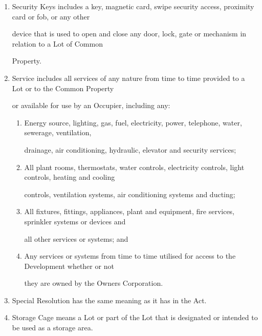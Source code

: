 \documentclass{article}
\begin{document}
\begin{enumerate}[label=\arabic*.]
\begin{enumerate}[label=\arabic{enumi}.\arabic*.]
\begin{enumerate}[label=(\arabic*)]
\item {\fontsize{9.962}{1} Security Keys includes a key, magnetic card, swipe security access, proximity card or fob, or any other }

{\fontsize{10.02}{1}device that is used to open and close any door, lock, gate or mechanism in relation to a Lot of Common }

{\fontsize{10.02}{1}Property. }

\item {\fontsize{9.962}{1} Service includes all services of any nature from time to time provided to a Lot or to the Common Property }

{\fontsize{10.02}{1}or available for use by an Occupier, including any: }

\begin{enumerate}[label=(\alph*)]
\item {\fontsize{9.962}{1} Energy source, lighting, gas, fuel, electricity, power, telephone, water, sewerage, ventilation, }

{\fontsize{10.02}{1}drainage, air conditioning, hydraulic, elevator and security services; }

\item {\fontsize{9.962}{1} All plant rooms, thermostats, water controls, electricity controls, light controls, heating and cooling }

{\fontsize{10.02}{1}controls, ventilation systems, air conditioning systems and ducting; }

\item {\fontsize{9.962}{1} All fixtures, fittings, appliances, plant and equipment, fire services, sprinkler systems or devices and }

{\fontsize{10.02}{1}all other services or systems; and }

\item {\fontsize{9.962}{1} Any services or systems from time to time utilised for access to the Development whether or not }

{\fontsize{10.02}{1}they are owned by the Owners Corporation. }

\end{enumerate}
\item {\fontsize{9.962}{1} Special Resolution has the same meaning as it has in the Act. }

\item {\fontsize{9.962}{1} Storage Cage means a Lot or part of the Lot that is designated or intended to be used as a storage area. }


\end{enumerate}
\end{enumerate}
\end{enumerate}
\end{document}
